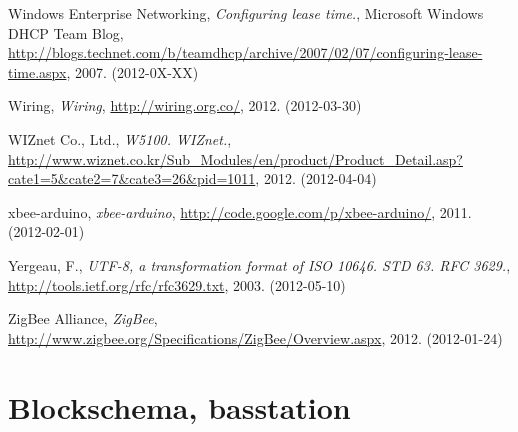 \documentclass[a4paper,11pt]{article}
\begin{document}
\begin{thebibliography}{9}
\label{wen}
    Windows Enterprise Networking,
    \emph{Configuring lease time.},
    Microsoft Windows DHCP Team Blog,
    \url{http://blogs.technet.com/b/teamdhcp/archive/2007/02/07/configuring-lease-time.aspx},
    2007. (2012-0X-XX)

\label{wiring}
    Wiring,
    \emph{Wiring},
    \url{http://wiring.org.co/},
    2012. (2012-03-30)

\label{wiznet}
    WIZnet Co., Ltd.,
    \emph{W5100.  WIZnet.},
    \url{http://www.wiznet.co.kr/Sub_Modules/en/product/Product_Detail.asp?cate1=5&cate2=7&cate3=26&pid=1011},
    2012. (2012-04-04)

\label{xbeearduino}
xbee-arduino,
\emph{xbee-arduino},
\url{http://code.google.com/p/xbee-arduino/},
2011. (2012-02-01)

\label{yergeau}
\label{rfc2277}
Yergeau, F.,
\emph{UTF-8, a transformation format of ISO 10646. STD 63. RFC 3629.},
\url{http://tools.ietf.org/rfc/rfc3629.txt},
2003. (2012-05-10)

\label{zigbee}
    ZigBee Alliance,
    \emph{ZigBee},
    \url{http://www.zigbee.org/Specifications/ZigBee/Overview.aspx},
    2012. (2012-01-24)

\end{thebibliography}

\appendix
\renewcommand{\appendixpagename}{Appendix}
\appendixpage
\renewcommand{\appendixtocname}{Appendix}

\addappheadtotoc

\section{Blockschema, basstation}
\end{document}
